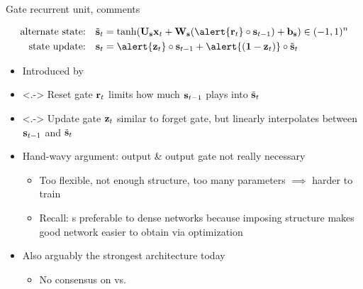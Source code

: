 \begin{frame}{Gate recurrent unit, comments}
    \begin{block}{}
        \vspace{-5mm}
        \begin{align*}
            \text{alternate state:} \quad \st_t &= \tanh(\U_\s \x_t + \W_\s (\alert{\r_t} \circ \s_{t-1}) + \b_\s) \in (-1, 1)^n \\
            \text{state update:} \quad \s_t &= \alert{\z_t} \circ \s_{t-1} + \alert{(\one - \z_t)} \circ \st_t
        \end{align*}
    \end{block}

    \begin{itemize}
        \item<+-> Introduced by \citet{ChoEMNLP14}
        \item<.-> \alert{Reset gate $\mathbf{r}_t$} limits how much $\mathbf{s}_{t-1}$ plays into $\tilde{\mathbf{s}}_t$
        \item<.-> \alert{Update gate $\mathbf{z}_t$} similar to \lstm{} forget gate, but linearly interpolates between $\mathbf{s}_{t-1}$ and $\tilde{\mathbf{s}}_t$
        \item<+-> Hand-wavy argument: \lstm{} output \& output gate not really necessary
        \begin{itemize}
            \item Too flexible, not enough structure, too many parameters $\implies$ harder to train
            \item Recall: \rnn{}s preferable to dense networks because imposing structure makes good network easier to obtain via optimization
        \end{itemize}
        \item<+-> Also arguably the strongest \rnn{} architecture today \citep{JozefowiczICML15}
        \begin{itemize}
            \item No consensus on \lstm{} vs.~\gru{}
        \end{itemize}
    \end{itemize}
\end{frame}

